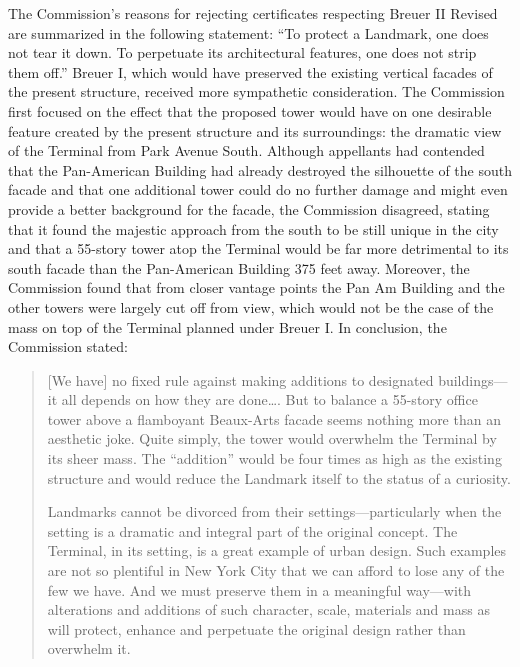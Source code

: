 The Commission's reasons for rejecting certificates respecting Breuer II Revised
are summarized in the following statement: ``To protect a Landmark, one does not
tear it down. To perpetuate its architectural features, one does not strip them
off.'' Breuer I, which would have preserved the existing vertical facades of the
present structure, received more sympathetic consideration. The Commission first
focused on the effect that the proposed tower would have on one desirable
feature created by the present structure and its surroundings: the dramatic view
of the Terminal from Park Avenue South. Although appellants had contended that
the Pan-American Building had already destroyed the silhouette of the south
facade and that one additional tower could do no further damage and might even
provide a better background for the facade, the Commission disagreed, stating
that it found the majestic approach from the south to be still unique in the
city and that a 55-story tower atop the Terminal would be far more detrimental
to its south facade than the Pan-American Building 375 feet away. Moreover, the
Commission found that from closer vantage points the Pan Am Building and the
other towers were largely cut off from view, which would not be the case of the
mass on top of the Terminal planned under Breuer I. In conclusion, the
Commission stated:
\begin{quotation}
[We have] no fixed rule against making additions to designated buildings---it
all depends on how they are done\ldots. But to balance a 55-story office tower
above a flamboyant Beaux-Arts facade seems nothing more than an aesthetic joke.
Quite simply, the tower would overwhelm the Terminal by its sheer mass. The
``addition'' would be four times as high as the existing structure and would
reduce the Landmark itself to the status of a curiosity.

Landmarks cannot be divorced from their settings---particularly when the
setting is a dramatic and integral part of the original concept. The Terminal,
in its setting, is a great example of urban design. Such examples are not so
plentiful in New York City that we can afford to lose any of the few we have.
And we must preserve them in a meaningful way---with alterations and additions
of such character, scale, materials and mass as will protect, enhance and
perpetuate the original design rather than overwhelm it.
\end{quotation}

